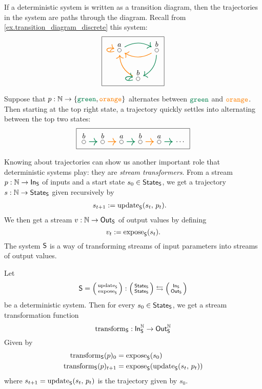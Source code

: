 \documentclass[DynamicalBook]{subfiles}
\begin{document}
\begin{example}\label{ex.transition_diagram_discrete_traj}
If a deterministic system is written as a transition diagram, then the
trajectories in the system are paths through the diagram. Recall from
\cref{ex.transition_diagram_discrete} this system:
\[
\begin{tikzpicture}
	\node[draw] {
  \begin{tikzcd}[column sep=small]
  	\LMO{a}\ar[rr, dgreen, thick, bend left]\ar[loop left, thick, orange]&&
  	\LMO{b}\ar[ll, thick, orange, bend left]\ar[dl, bend left, thick, dgreen]\\&
  	\LMO{b} \ar[ul, thick, orange, bend left] \ar[loop left, thick, dgreen]
  \end{tikzcd}
  };
\end{tikzpicture}
\]

Suppose that $p : \nn \to \{\Green, \Orange\}$
alternates between $\Green$ and ${\color{orange} \mathtt{orange}}$. Then
starting at the top right state, a trajectory quickly settles into alternating between the top two
states:
\[
\begin{tikzpicture}
	\node[draw] {
  \begin{tikzcd}[column sep=small]
    \LMO{b} \ar[r, dgreen, thick] & \LMO{b} \ar[r, orange, thick] & \LMO{a} \ar[r, dgreen,thick] & \LMO{b} \ar[r, orange, thick] & \LMO{a} \ar[r, dgreen, thick] & \cdots
  \end{tikzcd}
  };
\end{tikzpicture}
\]

\end{example}

Knowing about trajectories can show us another important role that deterministic
systems play: they are \emph{stream transformers}. From a stream $p : \mathbb{N} \to
\mathsf{In}_{\mathsf{S}}$ of inputs and a start state $s_0 \in \mathsf{State}_{\mathsf{S}}$, we get a trajectory $s
: \mathbb{N} \to \mathsf{State}_{\mathsf{S}}$ given recursively by
\begin{align*}
  s_{t+1} &:= \mathrm{update}_{\mathsf{S}}(s_t,\, p_t).
\end{align*}
We then get a stream $v : \mathbb{N} \to \mathsf{Out}_{\mathsf{S}}$ of output values by defining
$$v_t := \mathrm{expose}_{\mathsf{S}}(s_t).$$
The system $\mathsf{S}$ is a way of transforming streams of input parameters into
streams of output values.
\begin{proposition}
 Let $$\Sys{S} = \lens{\update{S}}{\expose{S}} : \lens{\State{S}}{\State{S}}
 \leftrightarrows \lens{\In{S}}{\Out{S}}$$
 be a deterministic system. Then for every $s_0 \in \mathsf{State}_{\mathsf{S}}$, we get a stream
 transformation function
 $$\mathrm{transform}_{\mathsf{S}} : \mathsf{In}_{\mathsf{S}}^{\mathbb{N}} \to \mathsf{Out}_{\mathsf{S}}^{\mathbb{N}}$$
 Given by
 \begin{align*}
   \mathrm{transform}_{\mathsf{S}}(p)_0 &= \mathrm{expose}_{\mathsf{S}}(s_0)\\
   \mathrm{transform}_{\mathsf{S}}(p)_{t + 1} &= \mathrm{expose}_{\mathsf{S}}(\mathrm{update}_{\mathsf{S}}(s_t,\, p_t))
 \end{align*}
 where $s_{t+1} = \mathrm{update}_{\mathsf{S}}({s_t,\, p_t})$ is the trajectory given by $s_0$.
\end{proposition}
\end{document}
